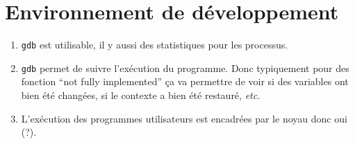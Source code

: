 \documentclass{article}
\begin{document}
\section{Environnement de développement}

\begin{enumerate}
\item {\tt gdb} est utilisable, il y aussi des statistiques pour les processus.
\item {\tt gdb} permet de suivre l'exécution du programme. Donc typiquement pour des fonction ``not fully implemented'' ça va permettre de voir si des variables ont bien été changées, si le contexte a bien été restauré, {\it etc}.
\item L'exécution des programmes utilisateurs est encadrées par le noyau donc oui (?).
\end{enumerate}
\end{document}
